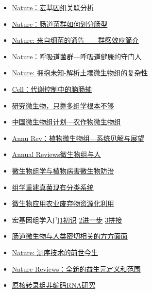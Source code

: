 \documentclass[]{article}
\providecommand{\tightlist}{%
  \setlength{\itemsep}{0pt}\setlength{\parskip}{0pt}}
\numberwithin{figure}{section}
\numberwithin{table}{section}
\begin{document}
\begin{itemize}
\tightlist
\item
  \href{http://mp.weixin.qq.com/s/CcDuohwezquBRhBW3FvMSg}{Nature：宏基因组关联分析}
\item
  \href{http://mp.weixin.qq.com/s/K3t7BpJ3LZvi4RNf69cJeA}{Nature：肠道菌群如何划分肠型}
\item
  \href{http://mp.weixin.qq.com/s/8ltHVYeYksKLCs70FUctpg}{Nature: 来自细菌的通告------群感效应简介}
\item
  \href{http://mp.weixin.qq.com/s/DBYuQh4Pz2ZNpFXW71dD_Q}{Nature：呼吸道菌群---呼吸道健康的守门人}
\item
  \href{http://mp.weixin.qq.com/s/Ff1s8SzMkfHKmM2vbcI7mw}{Nature: 拥抱未知-解析土壤微生物组的复杂性}
\item
  \href{http://mp.weixin.qq.com/s/cwElaRsaInfabuz0VF60gA}{Cell：代谢控制中的脑肠轴}
\item
  \href{http://mp.weixin.qq.com/s/OuK8frQaXPUoeFqXazkEgw}{研究微生物，只靠多组学根本不够}\\
\item
  \href{https://mp.weixin.qq.com/s/Ssy1Rq8bWrBzymWI-Xslmw}{中国微生物组计划---农作物微生物组}\\
\item
  \href{https://mp.weixin.qq.com/s/rx2ae4BcXqqkeX5LDi0h-Q}{Annu Rev：植物微生物组---系统见解与展望}\\
\item
  \href{http://mp.weixin.qq.com/s/DVJSY3zKKI3IDV9vW3khJw}{Annual Reviews\textbar 微生物组与人}
\item
  \href{https://mp.weixin.qq.com/s/Bba4ddqyvj2C0Mdx6cUm8A}{微生物组学与植物病害微生物防治}\\
\item
  \href{https://mp.weixin.qq.com/s/qpK28hjqvtPSCKKB9lWtYg}{组学重建真菌现有分类系统}\\
\item
  \href{http://mp.weixin.qq.com/s/zCk85qBaY5u5IHHHr99NNQ}{微生物应用\textbar 农业废弃物资源化利用}\\
\item
  宏基因组学入门\href{http://mp.weixin.qq.com/s/xVJtplV6LLofrt5DKqA9vA}{1初识} \href{http://mp.weixin.qq.com/s/Otz6Kk_g4N_pu5vHWaJCfA}{2进一步} \href{http://mp.weixin.qq.com/s/a1b-4bdjushFn1PqJ6NU2Q}{3拼接}\\
\item
  \href{http://mp.weixin.qq.com/s/KposoZo9X1TYxRCHYlLbtw}{肠道微生物与人类密切相关的方方面面}
\item
  \href{http://mp.weixin.qq.com/s/H-LF6dax0uYeJ-H1gDwycQ}{Nature: 测序技术的前世今生}
\item
  \href{http://mp.weixin.qq.com/s/hMImkvaugXD6Jkv9i0SvTQ}{Nature Reviews：全新的益生元定义和范围}
\item
  \href{http://mp.weixin.qq.com/s/MwEHXbPdpkKO5tuNKjqI8Q}{原核转录组非编码RNA研究}
\end{itemize}
\end{document}
